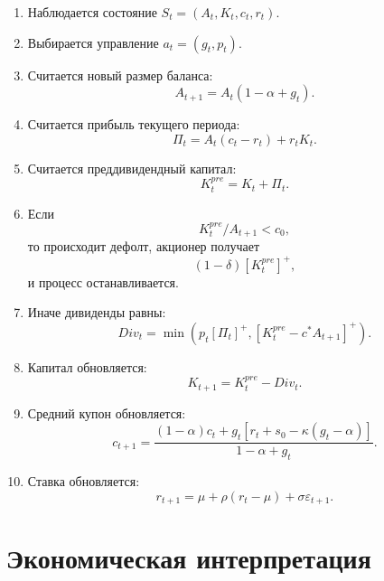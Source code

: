 \documentclass[11pt,a4paper]{article}
\newcommand{\1}{\mathbf{1}}
\newcommand{\pos}[1]{\left[#1\right]^+}
\begin{document}
\begin{enumerate}[label=\arabic*.]
    \item Наблюдается состояние $S_t=(A_t,K_t,c_t,r_t)$.
    \item Выбирается управление $a_t=(g_t,p_t)$.
    \item Считается новый размер баланса:
    \begin{equation}
        A_{t+1}=A_t(1-\alpha+g_t).
    \end{equation}
    \item Считается прибыль текущего периода:
    \begin{equation}
        \Pi_t=A_t(c_t-r_t)+r_tK_t.
    \end{equation}
    \item Считается преддивидендный капитал:
    \begin{equation}
        K_t^{pre}=K_t+\Pi_t.
    \end{equation}
    \item Если
    \begin{equation}
        K_t^{pre}/A_{t+1}<c_0,
    \end{equation}
    то происходит дефолт, акционер получает
    \begin{equation}
        (1-\delta)\pos{K_t^{pre}},
    \end{equation}
    и процесс останавливается.
    \item Иначе дивиденды равны:
    \begin{equation}
        Div_t=\min\left(p_t\pos{\Pi_t},\pos{K_t^{pre}-c^*A_{t+1}}\right).
    \end{equation}
    \item Капитал обновляется:
    \begin{equation}
        K_{t+1}=K_t^{pre}-Div_t.
    \end{equation}
    \item Средний купон обновляется:
    \begin{equation}
        c_{t+1}
        =
        \frac{(1-\alpha)c_t + g_t\left[r_t+s_0-\kappa(g_t-\alpha)\right]}
        {1-\alpha+g_t}.
    \end{equation}
    \item Ставка обновляется:
    \begin{equation}
        r_{t+1}=\mu+\rho(r_t-\mu)+\sigma\varepsilon_{t+1}.
    \end{equation}
\end{enumerate}

\section{Экономическая интерпретация}
\end{document}
